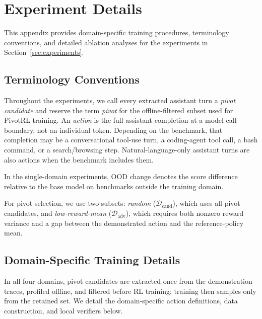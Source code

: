 \section{Experiment Details}
\label{app:experiment_details}

This appendix provides domain-specific training procedures, terminology conventions, and detailed ablation analyses for the experiments in Section~\ref{sec:experiments}.

\subsection{Terminology Conventions}
\label{app:terminology}

Throughout the experiments, we call every extracted assistant turn a \emph{pivot candidate} and reserve the term \emph{pivot} for the offline-filtered subset used for PivotRL training. An \emph{action} is the full assistant completion at a model-call boundary, not an individual token. Depending on the benchmark, that completion may be a conversational tool-use turn, a coding-agent tool call, a bash command, or a search/browsing step. Natural-language-only assistant turns are also actions when the benchmark includes them.

In the single-domain experiments, OOD change denotes the score difference relative to the base model on benchmarks outside the training domain. 

For pivot selection, we use two subsets: \emph{random} ($\mathcal{D}_{\mathrm{cand}}$), which uses all pivot candidates, and \emph{low-reward-mean} ($\mathcal{D}_{\mathrm{adv}}$), which requires both nonzero reward variance and a gap between the demonstrated action and the reference-policy mean.

\subsection{Domain-Specific Training Details}
\label{app:training_details}

In all four domains, pivot candidates are extracted once from the demonstration traces, profiled offline, and filtered before RL training; training then samples only from the retained set. We detail the domain-specific action definitions, data construction, and local verifiers below.


